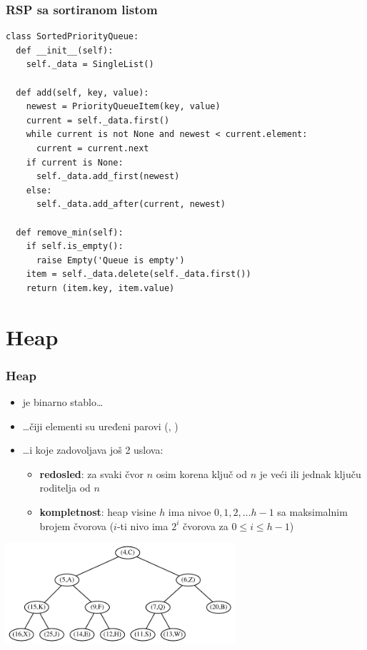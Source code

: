 \documentclass[compress,aspectratio=169]{beamer}
\begin{document}
\begin{frame}
  \frametitle{RSP sa sortiranom listom}
\begin{verbatim}
class SortedPriorityQueue:
  def __init__(self):
    self._data = SingleList()
    
  def add(self, key, value):
    newest = PriorityQueueItem(key, value)
    current = self._data.first()
    while current is not None and newest < current.element:
      current = current.next 
    if current is None:
      self._data.add_first(newest)
    else:
      self._data.add_after(current, newest)
    
  def remove_min(self):
    if self.is_empty():
      raise Empty('Queue is empty')
    item = self._data.delete(self._data.first())
    return (item.key, item.value)
\end{verbatim}
\end{frame}

\section[Heap]{Heap}
\begin{frame}[fragile]
  \frametitle{Heap}
  \begin{itemize}
    \item {} je binarno stablo\ldots 
    \item \ldots čiji elementi su uređeni parovi (, )
    \item \ldots i koje zadovoljava još 2 uslova:
    \begin{itemize}
      \item \textbf{redosled}: za svaki čvor $n$ osim korena ključ od $n$ je veći ili jednak ključu roditelja od $n$
      \item \textbf{kompletnost}: heap visine $h$ ima nivoe $0, 1, 2,\ldots h-1$ sa maksimalnim brojem čvorova ($i$-ti nivo ima $2^i$ čvorova za $0\leq i\leq
      h-1$)
    \end{itemize}
  \end{itemize}
  \begin{center}
    \includegraphics[width=8.5cm]{asp-09-pic02.pdf}
  \end{center}
\end{frame}
\end{document}

